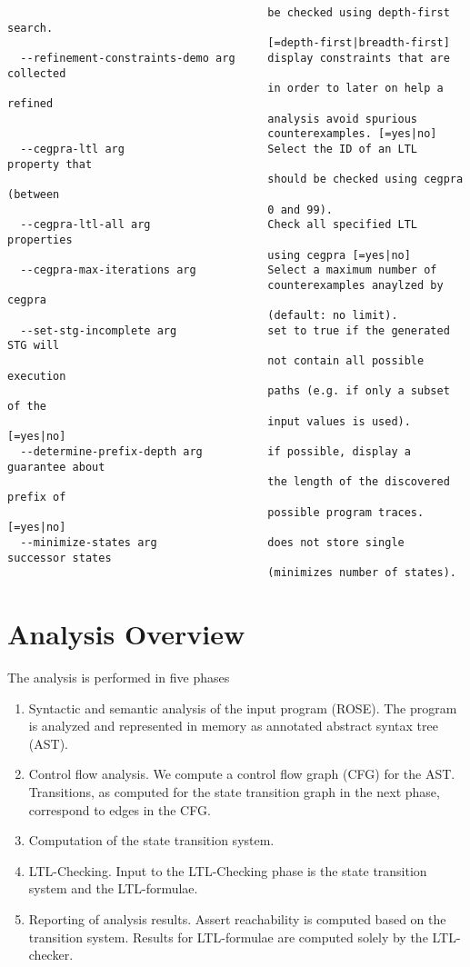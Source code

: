 \documentclass[natbib]{article}
\begin{document}
\begin{verbatim}
                                        be checked using depth-first search. 
                                        [=depth-first|breadth-first]
  --refinement-constraints-demo arg     display constraints that are collected 
                                        in order to later on help a refined 
                                        analysis avoid spurious 
                                        counterexamples. [=yes|no]
  --cegpra-ltl arg                      Select the ID of an LTL property that 
                                        should be checked using cegpra (between
                                        0 and 99).
  --cegpra-ltl-all arg                  Check all specified LTL properties 
                                        using cegpra [=yes|no]
  --cegpra-max-iterations arg           Select a maximum number of 
                                        counterexamples anaylzed by cegpra 
                                        (default: no limit).
  --set-stg-incomplete arg              set to true if the generated STG will 
                                        not contain all possible execution 
                                        paths (e.g. if only a subset of the 
                                        input values is used). [=yes|no]
  --determine-prefix-depth arg          if possible, display a guarantee about 
                                        the length of the discovered prefix of 
                                        possible program traces. [=yes|no]
  --minimize-states arg                 does not store single successor states 
                                        (minimizes number of states).
\end{verbatim}

\section{Analysis Overview}

The analysis is performed in five phases

\begin{enumerate}
\item Syntactic and semantic analysis of the input program (ROSE). The program is analyzed and represented in memory as annotated abstract syntax tree (AST).
\item Control flow analysis. We compute a control flow graph (CFG) for the AST. Transitions, as computed for the state transition graph in the next phase, correspond to edges in the CFG.
\item Computation of the state transition system.
\item LTL-Checking. Input to the LTL-Checking phase is the state transition system and the LTL-formulae.
\item Reporting of analysis results. Assert reachability is computed based on the transition system. Results for LTL-formulae are computed solely by the LTL-checker.
\end{enumerate}
\end{document}
